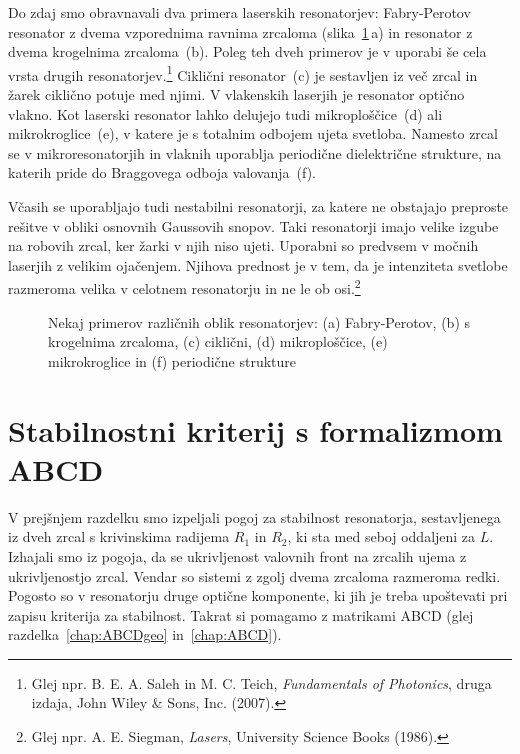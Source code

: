Do zdaj smo obravnavali dva primera laserskih resonatorjev: Fabry-Perotov
resonator z dvema vzporednima ravnima zrcaloma (slika~\ref{fig:resonatorji}\,a) 
in resonator z dvema krogelnima zrcaloma~(b).
Poleg teh dveh primerov je v uporabi še cela vrsta drugih resonatorjev.\footnote{Glej 
npr. B. E. A. Saleh in M. C. Teich, 
{\it Fundamentals of Photonics}, druga izdaja, John Wiley \& Sons, Inc. (2007).} Ciklični
resonator~(c) je
sestavljen iz več zrcal in žarek ciklično potuje med njimi. V vlakenskih laserjih je resonator
optično vlakno. 
Kot laserski resonator lahko delujejo tudi mikroploščice~(d) ali mikrokroglice~(e), 
v katere je s totalnim odbojem ujeta svetloba. 
Namesto zrcal se v mikroresonatorjih in vlaknih uporablja periodične dielektrične strukture, na katerih 
pride do Braggovega odboja valovanja~(f).
\begin{remark}
Včasih se uporabljajo tudi nestabilni resonatorji, za 
katere ne obstajajo preproste rešitve v obliki osnovnih Gaussovih snopov. Taki resonatorji 
imajo velike izgube na robovih zrcal, ker žarki v njih niso ujeti. 
Uporabni so predvsem v močnih laserjih z velikim ojačenjem. Njihova prednost je v tem, da 
je intenziteta svetlobe razmeroma velika v celotnem resonatorju in ne le ob 
osi.\footnote{Glej npr. A. E. Siegman, {\it Lasers}, University Science Books (1986).}
\end{remark}

\begin{figure}[ht]
\centering
\def\svgwidth{126truemm} 

\caption{Nekaj primerov različnih oblik resonatorjev: (a) Fabry-Perotov, (b) s krogelnima
zrcaloma, (c) ciklični, (d) mikroploščice, (e) mikrokroglice in (f) periodične strukture}
\label{fig:resonatorji}
\end{figure}

\section{Stabilnostni kriterij s formalizmom ABCD}
V prejšnjem razdelku smo izpeljali pogoj za stabilnost resonatorja, 
sestavljenega iz dveh zrcal s krivinskima radijema $R_1$ in $R_2$, ki sta med 
seboj oddaljeni za $L$. Izhajali smo iz pogoja, da se ukrivljenost
valovnih front na zrcalih ujema z ukrivljenostjo zrcal. Vendar so sistemi z
zgolj dvema zrcaloma razmeroma redki. Pogosto so v resonatorju
druge optične komponente, ki jih je treba upoštevati pri zapisu
kriterija za stabilnost. Takrat si pomagamo z matrikami ABCD
(glej razdelka~\ref{chap:ABCDgeo} in~\ref{chap:ABCD}). 

